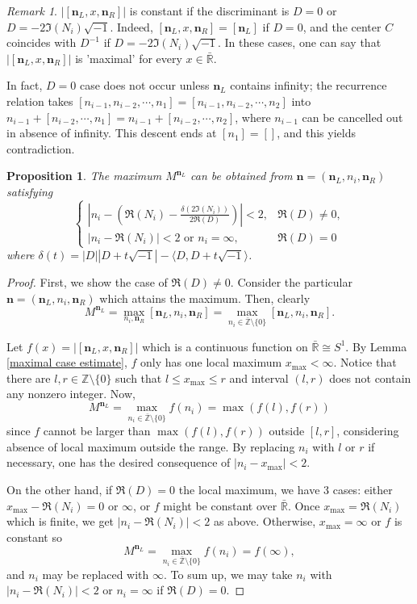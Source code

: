 \documentclass{article}
\theoremstyle{definition}
\theoremstyle{plain}
\newtheorem{proposition}{Proposition}
\theoremstyle{remark}
\newtheorem*{remark}{Remark}
\numberwithin{equation}{section}
\newcommand{\bZ}{\mathbb{Z}}
\newcommand{\bR}{\mathbb{R}}
\newcommand{\abs}[1]{\left| {#1} \right|}
\newcommand{\inprod}[2]{\langle {#1}, {#2} \rangle}
\newcommand{\im}{{\sqrt{-1}}}
\def\ns{{\mathbf{n}}}
\def\nsL{{\mathbf{n}_L}}
\def\nsR{{\mathbf{n}_R}}
\begin{document}
\begin{remark}
  $\abs{[\nsL, x, \nsR]}$ is constant if the discriminant is $D = 0$ or $D = - 2 \Im(N_i) \im$.
  Indeed, $[\nsL, x, \nsR] = [\nsL]$ if $D = 0$,
  and the center $C$ coincides with $D^{-1}$ if $D = -2 \Im(N_i) \im$.
  In these cases, one can say that $\abs{[\nsL, x, \nsR]}$ is 'maximal' for every $x \in \bar{\bR}$.

  In fact, $D = 0$ case does not occur unless $\nsL$ contains infinity;
  the recurrence relation takes
  $[n_{i-1}, n_{i-2}, \cdots, n_1] = [n_{i-1}, n_{i-2}, \cdots, n_2]$
  into $n_{i-1} + [n_{i-2}, \cdots, n_1] = n_{i-1} + [n_{i-2}, \cdots, n_2]$,
  where $n_{i-1}$ can be cancelled out in absence of infinity.
  This descent ends at $[n_1] = []$, and this yields contradiction.
\end{remark}

\begin{proposition}\label{maximal ni estimate}
  The maximum $M^{\nsL}$ can be obtained from $\ns = (\nsL, n_i, \nsR)$ satisfying
  \[
    \begin{cases}
      \abs{n_i - \left(\Re(N_i) - \frac{\delta(2 \Im(N_i))}{2 \Re(D)} \right)} < 2, & \Re(D) \neq 0, \\
      \abs{n_i - \Re(N_i)} < 2 \text{ or } n_i = \infty, & \Re(D) = 0
    \end{cases}
  \]
  where $\delta(t) = \abs{D} \abs{D + t \im} - \inprod{D}{D + t \im}$.
\end{proposition}
\begin{proof}
  First, we show the case of $\Re(D) \neq 0$.
  Consider the particular $\ns = (\nsL, n_i, \nsR)$ which attains the maximum.
  Then, clearly
  \[ M^{\nsL} = \max_{n_i, \nsR} [\nsL, n_i, \nsR] = \max_{n_i \in \bar{\bZ} \setminus \{0\}} [\nsL, n_i, \nsR]. \]

  Let $f(x) = \abs{[\nsL, x, \nsR]}$ which is a continuous function on $\bar{\bR} \cong S^1$.
  By Lemma \ref{maximal case estimate}, $f$ only has one local maximum $x_{\max} < \infty$.
  Notice that there are $l, r \in \bZ \setminus \{0\}$
  such that $l \leq x_{\max} \leq r$ and interval $(l, r)$ does not contain any nonzero integer.
  Now,
  \[
    M^{\nsL} = \max_{n_i \in \bar{\bZ} \setminus \{0\}} f(n_i) = \max(f(l), f(r))
  \]
  since $f$ cannot be larger than $\max(f(l), f(r))$ outside $[l, r]$, considering absence of local maximum outside the range.
  By replacing $n_i$ with $l$ or $r$ if necessary, one has the desired consequence of $\abs{n_i - x_{\max}} < 2$.

  On the other hand, if $\Re(D) = 0$ the local maximum, we have 3 cases:
  either $x_{\max} - \Re(N_i) = 0$ or $\infty$, or $f$ might be constant over $\bar{\bR}$.
  Once $x_{\max} = \Re(N_i)$ which is finite, we get $\abs{n_i - \Re(N_i)} < 2$ as above.
  Otherwise, $x_{\max} = \infty$ or $f$ is constant so
  \[
    M^{\nsL} = \max_{n_i \in \bar{\bZ} \setminus \{0\}} f(n_i) = f(\infty),
  \]
  and $n_i$ may be replaced with $\infty$.
  To sum up, we may take $n_i$ with $\abs{n_i - \Re(N_i)} < 2$ or $n_i = \infty$ if $\Re(D) = 0$.
\end{proof}
\end{document}
